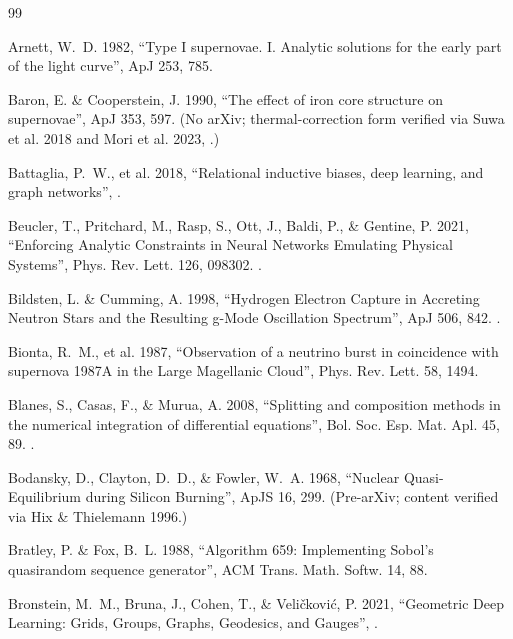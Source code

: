 \begingroup
\raggedright
\begin{thebibliography}{99}

Arnett, W.~D. 1982, ``Type I supernovae. I. Analytic solutions for the early
part of the light curve'', ApJ 253, 785.

Baron, E. \& Cooperstein, J. 1990, ``The effect of iron core structure on
supernovae'', ApJ 353, 597. (No arXiv; thermal-correction form verified via
Suwa et al. 2018 and Mori et al. 2023, .)

Battaglia, P.~W., et al. 2018, ``Relational inductive biases, deep learning,
and graph networks'', .

Beucler, T., Pritchard, M., Rasp, S., Ott, J., Baldi, P., \& Gentine, P. 2021,
``Enforcing Analytic Constraints in Neural Networks Emulating Physical
Systems'', Phys. Rev. Lett. 126, 098302. .

Bildsten, L. \& Cumming, A. 1998, ``Hydrogen Electron Capture in Accreting
Neutron Stars and the Resulting g-Mode Oscillation Spectrum'', ApJ 506, 842.
.

Bionta, R.~M., et al. 1987, ``Observation of a neutrino burst in coincidence
with supernova 1987A in the Large Magellanic Cloud'', Phys. Rev. Lett. 58,
1494.

Blanes, S., Casas, F., \& Murua, A. 2008, ``Splitting and composition methods
in the numerical integration of differential equations'', Bol. Soc. Esp. Mat.
Apl. 45, 89. .

Bodansky, D., Clayton, D.~D., \& Fowler, W.~A. 1968, ``Nuclear
Quasi-Equilibrium during Silicon Burning'', ApJS 16, 299. (Pre-arXiv; content
verified via Hix \& Thielemann 1996.)

Bratley, P. \& Fox, B.~L. 1988, ``Algorithm 659: Implementing Sobol's
quasirandom sequence generator'', ACM Trans. Math. Softw. 14, 88.

Bronstein, M.~M., Bruna, J., Cohen, T., \& Veličković, P. 2021, ``Geometric
Deep Learning: Grids, Groups, Graphs, Geodesics, and Gauges'',
.


\end{thebibliography}
